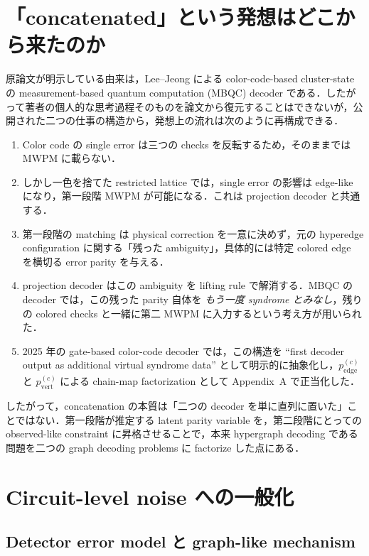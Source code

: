 \documentclass[a4paper,11pt]{ltjsarticle}
\begin{document}
\section{「concatenated」という発想はどこから来たのか}

原論文が明示している由来は，Lee--Jeong による color-code-based cluster-state の measurement-based quantum computation (MBQC) decoder である．したがって著者の個人的な思考過程そのものを論文から復元することはできないが，公開された二つの仕事の構造から，発想上の流れは次のように再構成できる．

\begin{enumerate}
  \item Color code の single error は三つの checks を反転するため，そのままでは MWPM に載らない．
  \item しかし一色を捨てた restricted lattice では，single error の影響は edge-like になり，第一段階 MWPM が可能になる．これは projection decoder と共通する．
  \item 第一段階の matching は physical correction を一意に決めず，元の hyperedge configuration に関する「残った ambiguity」，具体的には特定 colored edge を横切る error parity を与える．
  \item projection decoder はこの ambiguity を lifting rule で解消する．MBQC の decoder では，この残った parity 自体を \emph{もう一度 syndrome とみなし}，残りの colored checks と一緒に第二 MWPM に入力するという考え方が用いられた．
  \item 2025 年の gate-based color-code decoder では，この構造を ``first decoder output as additional virtual syndrome data'' として明示的に抽象化し，$p_{\mathrm{edge}}^{(c)}$ と $p_{\mathrm{vert}}^{(c)}$ による chain-map factorization として Appendix~A で正当化した．
\end{enumerate}

したがって，concatenation の本質は「二つの decoder を単に直列に置いた」ことではない．第一段階が推定する latent parity variable を，第二段階にとっての observed-like constraint に昇格させることで，本来 hypergraph decoding である問題を二つの graph decoding problems に factorize した点にある．

\section{Circuit-level noise への一般化}
\subsection{Detector error model と graph-like mechanism}
\end{document}
